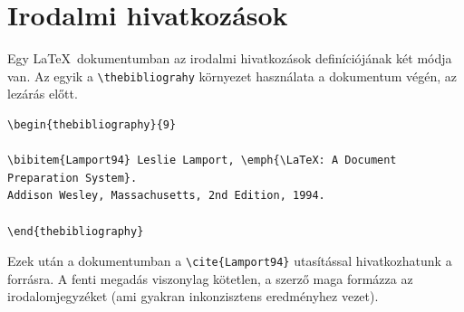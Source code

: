 \section{Irodalmi hivatkozások}\label{sect:HowtoReference}
Egy \LaTeX~dokumentumban az irodalmi hivatkozások definíciójának két módja van. Az egyik a \verb+\thebibliograhy+ környezet használata a dokumentum végén, az \verb++ lezárás előtt.
\begin{lstlisting}
\begin{thebibliography}{9}

\bibitem{Lamport94} Leslie Lamport, \emph{\LaTeX: A Document Preparation System}.
Addison Wesley, Massachusetts, 2nd Edition, 1994.

\end{thebibliography}
\end{lstlisting}

Ezek után a dokumentumban a \verb+\cite{Lamport94}+ utasítással hivatkozhatunk a forrásra. A fenti megadás viszonylag kötetlen, a szerző maga formázza az irodalomjegyzéket (ami gyakran inkonzisztens eredményhez vezet).

